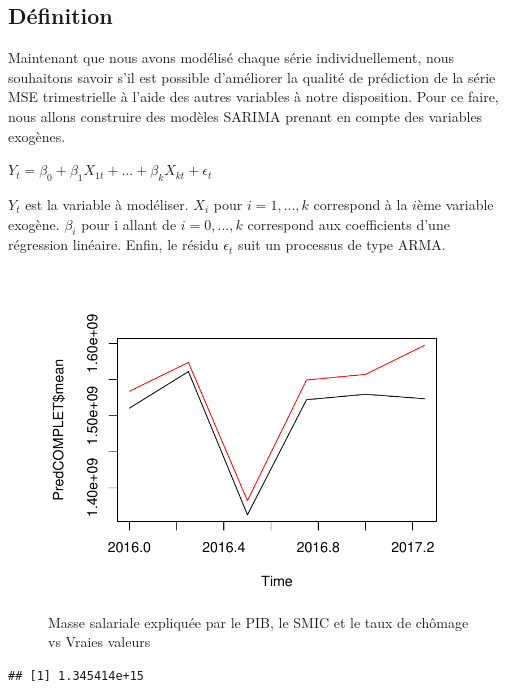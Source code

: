 \documentclass[11pt,]{article}
\begin{document}
\subsection{Définition}\label{definition-2}

Maintenant que nous avons modélisé chaque série individuellement, nous
souhaitons savoir s'il est possible d'améliorer la qualité de prédiction
de la série MSE trimestrielle à l'aide des autres variables à notre
disposition. Pour ce faire, nous allons construire des modèles SARIMA
prenant en compte des variables exogènes.

\(Y_{t} = \beta_{0} +\beta_{1}X_{1t} + ... + \beta_{k}X_{kt} + \epsilon_{t}\)

\(Y_{t}\) est la variable à modéliser. \(X_{i}\) pour \(i = 1, ..., k\)
correspond à la \(i\)ème variable exogène. \(\beta_{i}\) pour i allant
de \(i = 0, ..., k\) correspond aux coefficients d'une régression
linéaire. Enfin, le résidu \(\epsilon_{t}\) suit un processus de type
ARMA.

\begin{figure}

{\centering \includegraphics{doc_files/figure-latex/unnamed-chunk-59-1} 

}

\caption{\label{fig35} Masse salariale expliquée par le PIB, le SMIC et le taux de chômage vs Vraies valeurs}\label{fig:unnamed-chunk-59}
\end{figure}

\begin{verbatim}
## [1] 1.345414e+15
\end{verbatim}
\end{document}
